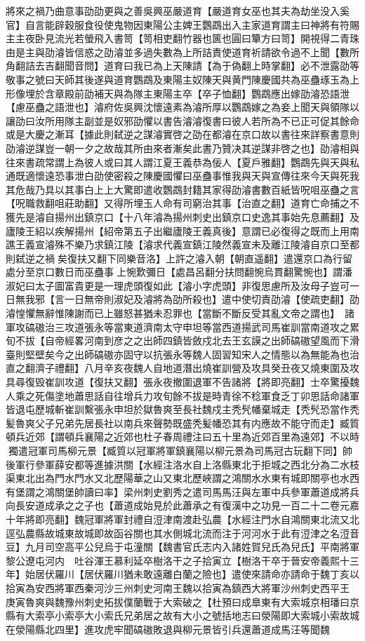 將來之禍乃曲意事劭劭更與之善吳興巫嚴道育【嚴道育女巫也其夫為劫坐没入奚官】自言能辟穀服食役使鬼物因東陽公主婢王鸚鵡出入主家道育謂主曰神將有符賜主主夜卧見流光若螢飛入書笥【笥相吏翻竹器也篋也圓曰簞方曰笥】開視得二青珠由是主與劭濬皆信惑之劭濬並多過失數為上所詰責使道育祈請欲令過不上聞【數所角翻詰去吉翻聞音問】道育曰我已為上天陳請【為于偽翻上時掌翻】必不泄露劭等敬事之號曰天師其後遂與道育鸚鵡及東陽主奴陳天與黄門陳慶國共為巫蠱琢玉為上形像埋於含章殿前劭補天與為隊主東陽主卒【卒子恤翻】鸚鵡應出嫁劭濬恐語泄【慮巫蠱之語泄也】濬府佐吳興沈懷遠素為濬所厚以鸚鵡嫁之為妾上聞天與領隊以讓劭曰汝所用隊主副並是奴邪劭懼以書告濬濬復書曰彼人若所為不已正可促其餘命或是大慶之漸耳【據此則弑逆之謀濬實啓之劭在都濬在京口故以書往來詳察書意則劭濬逆謀豈一朝一夕之故哉其所由來者漸矣此書乃贊决其逆謀非啓之也】劭濬相與往來書疏常謂上為彼人或曰其人謂江夏王義恭為佞人【夏戶雅翻】鸚鵡先與天與私通既適懷遠恐事泄白劭使密殺之陳慶國懼曰巫蠱事惟我與天與宣傳往來今天與死我其危哉乃具以其事白上上大驚即遣收鸚鵡封籍其家得劭濬書數百紙皆呪咀巫蠱之言【呪職救翻咀莊助翻】又得所埋玉人命有司窮治其事【治直之翻】道育亡命捕之不獲先是濬自揚州出鎮京口【十八年濬為揚州刺史出鎮京口史逸其事始先息薦翻】及廬陵王紹以疾解揚州【紹帝第五子出繼廬陵王義真後】意謂已必復得之既而上用南譙王義宣濬殊不樂乃求鎮江陵【濬求代義宣鎮江陵然義宣未及離江陵濬自京口至都則弑逆之禍矣復扶又翻下同樂音洛】上許之濬入朝【朝直遥翻】遣還京口為行留處分至京口數日而巫蠱事上惋歎彌日【處昌呂翻分扶問翻惋烏貫翻驚惋也】謂潘淑妃曰太子圖富貴更是一理虎頭復如此【濬小字虎頭】非復思慮所及汝母子豈可一日無我邪【言一日無帝則淑妃及濬將為劭所殺也】遣中使切責劭濬【使疏吏翻】劭濬惶懼無辭惟陳謝而已上雖怒甚猶未忍罪也【當斷不斷反受其亂文帝之謂也】　諸軍攻碻磝治三攻道張永等當東道濟南太守申坦等當西道揚武司馬崔訓當南道攻之累旬不拔【自帝經畧河南到彦之之出師四鎮皆斂戍北去王玄謨之出師碻磝望風而下滑臺則堅壁矣今之出師碻磝亦固守以抗張永等魏人固習知宋人之情態以為無能為也治直之翻濟子禮翻】八月辛亥夜魏人自地道潛出燒崔訓營及攻具癸丑夜又燒東圍及攻具尋復毁崔訓攻道【復扶又翻】張永夜撤圍退軍不告諸將【將即亮翻】士卒驚擾魏人乘之死傷塗地蕭思話自往增兵力攻旬餘不拔是時青徐不稔軍食乏丁卯思話命諸軍皆退屯歷城斬崔訓繫張永申坦於獄魯爽至長社魏戍主秃髠幡棄城走【秃髠恐當作秃髪魯爽父子兄弟先居長社以南兵來聲勢既盛秃髪幡恐其有内應故不能守而走】臧質頓兵近郊【謂頓兵襄陽之近郊也杜子春周禮注曰五十里為近郊百里為遠郊】不以時獨遣冠軍司馬柳元景【臧質以冠軍將軍鎮襄陽以柳元景為司馬冠古玩翻下同】帥後軍行參軍薛安都等進據洪關【水經注洛水自上洛縣東北于拒城之西北分為二水枝渠東北出為門水門水又北歷陽華之山又東北歷峽謂之鴻關水水東有城即關亭也水西有堡謂之鴻關堡帥讀曰率】梁州刺史劉秀之遣司馬馬汪與左軍中兵參軍蕭道成將兵向長安道成承之之子也【蕭道成始見於此蕭承之有復漢中之功見一百二十二卷元嘉十年將即亮翻】魏冠軍將軍封禮自浢津南渡赴弘農【水經注門水自鴻關東北流又北逕弘農縣故城東故城即故函谷關也其水側城北流而注于河河水于此有浢津之名浢音豆】九月司空高平公兒烏于屯潼關【魏書官氏志内入諸姓賀兒氏為兒氏】平南將軍黎公遼屯河内　吐谷渾王慕利延卒樹洛干之子拾寅立【樹洛干卒于晉安帝義熙十三年】始居伏羅川【居伏羅川猶未敢遠離白蘭之險也】遣使來請命亦請命于魏丁亥以拾寅為安西將軍西秦河沙三州刺史河南王魏以拾寅為鎮西大將軍沙州刺史西平王　庚寅魯爽與魏豫州刺史拓拔僕蘭戰于大索破之【杜預曰成臯東有大索城京相璠曰京縣有大索亭小索亭大小索氏兄弟居之故有大小之號括地志曰滎陽即大索城小索故城在滎陽縣北四里】進攻虎牢聞碻磝敗退與柳元景皆引兵還蕭道成馬汪等聞魏